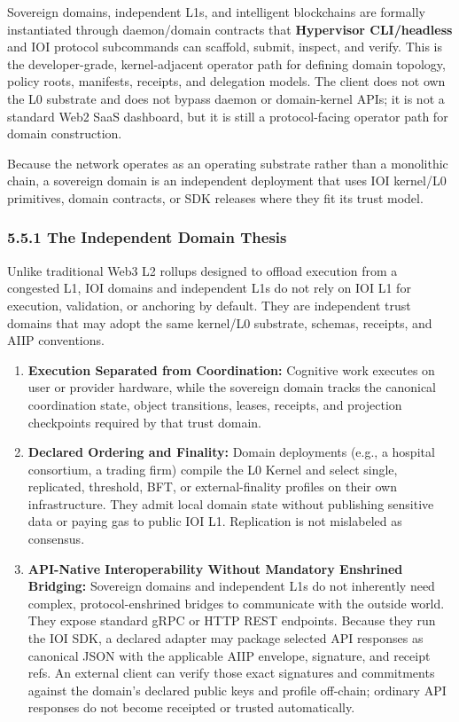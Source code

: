 \documentclass[
  11pt,
]{article}
\providecommand{\tightlist}{%
  \setlength{\itemsep}{0pt}\setlength{\parskip}{0pt}}
\begin{document}
Sovereign domains, independent L1s, and intelligent blockchains are
formally instantiated through daemon/domain contracts that
\textbf{Hypervisor CLI/headless} and IOI protocol subcommands can
scaffold, submit, inspect, and verify. This is the developer-grade,
kernel-adjacent operator path for defining domain topology, policy
roots, manifests, receipts, and delegation models. The client does not
own the L0 substrate and does not bypass daemon or domain-kernel APIs;
it is not a standard Web2 SaaS dashboard, but it is still a
protocol-facing operator path for domain construction.

Because the network operates as an operating substrate rather than a
monolithic chain, a sovereign domain is an independent deployment that
uses IOI kernel/L0 primitives, domain contracts, or SDK releases where
they fit its trust model.

\hypertarget{the-independent-domain-thesis}{%
\subsubsection{5.5.1 The Independent Domain
Thesis}\label{the-independent-domain-thesis}}

Unlike traditional Web3 L2 rollups designed to offload execution from a
congested L1, IOI domains and independent L1s do not rely on IOI L1 for
execution, validation, or anchoring by default. They are
independent trust domains that may adopt the same kernel/L0 substrate,
schemas, receipts, and AIIP conventions.

\begin{enumerate}
\def\labelenumi{\arabic{enumi}.}
\tightlist
\item
  \textbf{Execution Separated from Coordination:} Cognitive work
  executes on user or provider hardware, while the sovereign domain tracks
  the canonical coordination state, object transitions, leases,
  receipts, and projection checkpoints required by that trust domain.
\item
  \textbf{Declared Ordering and Finality:} Domain deployments (e.g., a hospital
  consortium, a trading firm) compile the L0 Kernel and select single,
  replicated, threshold, BFT, or external-finality profiles on their own
  infrastructure. They admit local domain state without publishing sensitive
  data or paying gas to public IOI L1. Replication is not mislabeled as
  consensus.
\item
  \textbf{API-Native Interoperability Without Mandatory Enshrined
  Bridging:} Sovereign domains and independent L1s do not inherently need complex,
  protocol-enshrined bridges to communicate with the outside world. They
  expose standard gRPC or HTTP REST endpoints. Because they run the IOI
  SDK, a declared adapter may package selected API responses as canonical JSON
  with the applicable AIIP envelope, signature, and receipt refs. An external
  client can verify those exact signatures and commitments against the
  domain's declared public keys and profile off-chain; ordinary API responses
  do not become receipted or trusted automatically.
\end{enumerate}
\end{document}
